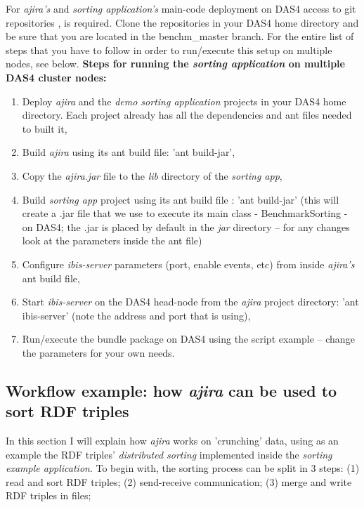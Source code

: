 For \textit{ajira's} and \textit{sorting application's} main-code deployment on DAS4 access to git repositories \cite{arch_repo}, \cite{qpie_repo} is required. Clone the repositories in your DAS4 home directory and be sure that you are located in the benchm\_master branch. For the entire list of steps that you have to follow in order to run/execute this setup on multiple nodes, see below.
\newline
\newline
\textbf{Steps for running the \textit{sorting application} on multiple DAS4 cluster nodes:}
\begin{enumerate}
	\item Deploy \textit{ajira} and the \textit{demo sorting application} projects in your DAS4 home directory. Each project already has all the dependencies and ant files needed to built it, 
	\item Build \textit{ajira} using its ant build file: 'ant build-jar',
	\item Copy the \textit{ajira.jar} file to the \textit{lib} directory of the \textit{sorting app},
	\item Build \textit{sorting app} project using its ant build file \cite{build_file}: 'ant build-jar' (this will create a .jar file that we use to execute its main class - BenchmarkSorting - on DAS4; the .jar is placed by default in the \textit{jar} directory -- for any changes look at the parameters inside the ant file)
	\item Configure \textit{ibis-server} parameters (port, enable events, etc) from inside \textit{ajira's} ant build file,
	\item Start \textit{ibis-server} on the DAS4 head-node from the \textit{ajira} project directory: 'ant ibis-server' (note the address and port that is using),
	\item Run/execute the bundle package on DAS4 using the script example \cite{run_on_das4} -- change the parameters for your own needs.
\end{enumerate}

% 
\subsection{Workflow example: how \textit{ajira} can be used to sort RDF triples}

In this section I will explain how \textit{ajira} works on 'crunching' data, using as an example the RDF triples' \textit{distributed sorting} implemented inside the \textit{sorting example application}. To begin with, the sorting process can be split in 3 steps: (1) read and sort RDF triples; (2) send-receive communication; (3) merge and write RDF triples in files;

